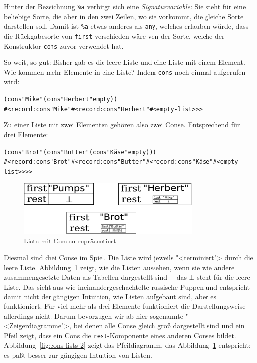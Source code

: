 Hinter der Bezeichnung \verb$%a$ verbirgt sich eine 
\emph{Signaturvariable}: Sie
steht für eine beliebige Sorte, die aber in den zwei Zeilen, wo sie vorkommt,
die gleiche Sorte darstellen soll.  Damit ist \verb$%a$ etwas anderes als
\texttt{any}, welches erlauben würde, dass die Rückgabesorte von \texttt{first}
verschieden wäre von der Sorte, welche der Konstruktor \texttt{cons} zuvor
verwendet hat.

So weit, so gut: Bisher gab es die leere Liste und eine Liste mit einem
Element.  Wie kommen mehr Elemente in eine Liste?  Indem
\texttt{cons} noch einmal aufgerufen wird:
%
\begin{alltt}
(cons "Mike" (cons "Herbert" empty))
\evalsto{}#<record:cons "Mike" #<record:cons "Herbert" #<empty-list>>>
\end{alltt}
%
Zu einer Liste mit zwei Elementen gehören also zwei Conse.
Entsprechend für drei Elemente:
%
\begin{alltt}
(cons "Brot" (cons "Butter" (cons "Käse" empty)))
\evalsto{}#<record:cons "Brot" #<record:cons "Butter" #<record:cons "Käse" #<empty-list>>>>
\end{alltt}
%
\begin{figure}[tb]
  \centering
  \includegraphics[width=0.8\textwidth]{pair-lists1}
  \caption{Liste mit Consen repräsentiert}
  \label{fig:cons-lists-1}
\end{figure}
Diesmal sind drei Conse im Spiel.  Die Liste wird jeweils
"<terminiert"> durch die leere Liste.  Abbildung~\ref{fig:cons-lists-1}
zeigt, wie die Listen aussehen, wenn sie wie andere zusammengesetzte
Daten als Tabellen dargestellt sind~-- das $\bot$ steht für die leere
Liste. Das sieht aus wie ineinandergeschachtelte russische Puppen und
entspricht damit nicht der gängigen Intuition, wie Listen aufgebaut
sind, aber es funktioniert.  Für viel mehr als drei Elemente
funktioniert die Darstellungsweise allerdings nicht: Darum bevorzugen
wir ab hier sogenannte "<Zeigerdiagramme">, bei denen alle Conse gleich groß
dargestellt sind und ein Pfeil zeigt, dass ein Cons die
\texttt{rest}-Komponente eines anderen Conses bildet.
Abbildung~\ref{fig:cons-lists-2} zeigt das Pfeildiagramm, das
Abbildung~\ref{fig:cons-lists-1} entspricht; es paßt besser zur
gängigen Intuition von Listen.

